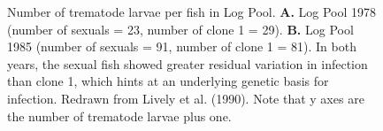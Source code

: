 \documentclass[
  letterpaper,
]{book}
\begin{document}
\begin{figure}


\caption[Number of trematode larvae per fish in Log
Pool]{\label{fig-5-1}Number of trematode larvae per fish in Log Pool.
\textbf{A.} Log Pool 1978 (number of sexuals = 23, number of clone 1 =
29). \textbf{B.} Log Pool 1985 (number of sexuals = 91, number of clone
1 = 81). In both years, the sexual fish showed greater residual
variation in infection than clone 1, which hints at an underlying
genetic basis for infection. Redrawn from Lively et al. (1990). Note
that y axes are the number of trematode larvae plus one.}

\end{figure}%
\end{document}
